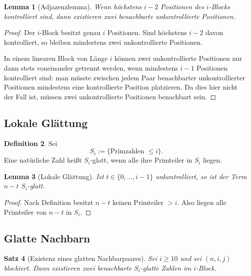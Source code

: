 \documentclass[12pt,a4paper]{article}
\theoremstyle{plain}
\newtheorem{theorem}{Satz}[section]
\newtheorem{lemma}[theorem]{Lemma}
\theoremstyle{definition}
\newtheorem{definition}[theorem]{Definition}
\theoremstyle{remark}
\begin{document}
	\begin{lemma}[Adjazenzlemma]
		\label{lem:adjacency}
		Wenn höchstens \(i-2\) Positionen des \(i\)-Blocks kontrolliert sind, dann existieren
		zwei benachbarte unkontrollierte Positionen.
	\end{lemma}
	
	\begin{proof}
		Der \(i\)-Block besitzt genau \(i\) Positionen. Sind höchstens \(i-2\) davon kontrolliert,
		so bleiben mindestens zwei unkontrollierte Positionen.
		
		In einem linearen Block von Länge \(i\) können zwei unkontrollierte Positionen nur dann
		stets voneinander getrennt werden, wenn mindestens \(i-1\) Positionen kontrolliert sind:
		man müsste zwischen jedem Paar benachbarter unkontrollierter Positionen mindestens eine
		kontrollierte Position platzieren. Da dies hier nicht der Fall ist, müssen zwei
		unkontrollierte Positionen benachbart sein.
	\end{proof}
	
	\subsection{Lokale Glättung}
	
	\begin{definition}
		Sei
		\[
		S_i:=\{\text{Primzahlen } \le i\}.
		\]
		Eine natürliche Zahl heißt \(S_i\)-glatt, wenn alle ihre Primteiler in \(S_i\) liegen.
	\end{definition}
	
	\begin{lemma}[Lokale Glättung]
		\label{lem:local-smoothing}
		Ist \(t\in\{0,\dots,i-1\}\) unkontrolliert, so ist der Term \(n-t\) \(S_i\)-glatt.
	\end{lemma}
	
	\begin{proof}
		Nach Definition besitzt \(n-t\) keinen Primteiler \(>i\). Also liegen alle Primteiler
		von \(n-t\) in \(S_i\).
	\end{proof}
	
	\subsection{Glatte Nachbarn}
	
	\begin{theorem}[Existenz eines glatten Nachbarpaares]
		\label{thm:smooth-pair}
		Sei \(i\ge10\) und sei \((n,i,j)\) blockiert. Dann existieren zwei benachbarte \(S_i\)-glatte Zahlen im \(i\)-Block.
	\end{theorem}
	
\end{document}

